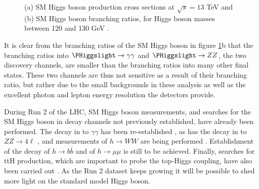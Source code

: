 \begin{figure}[h!]
\begin{center}
\end{center}
\caption{(a) \ac{SM} Higgs boson production cross sections at $\sqrt{s} = 13$ TeV and (b) \ac{SM}
Higgs boson branching ratios, for Higgs boson masses between 120 and 130 GeV \cite{YR4}.}
\label{fig:theory_smhxsbr}
\end{figure}

It is clear from the branching ratios of the \ac{SM} Higgs boson in figure \ref{fig:theory_smhxsbr}b that
the branching ratios into
$\PHiggslight \rightarrow \gamma\gamma$ and $\PHiggslight \rightarrow ZZ$, the two discovery
channels, are smaller than the branching ratios into many other final states.
These two channels are thus not sensitive as a result of their branching ratio, but
rather due to the small backgrounds in these analysis as well as the excellent photon and lepton energy resolution the detectors provide.

During Run 2 of the LHC, \ac{SM} Higgs boson measurements, and searches for the 
\ac{SM} Higgs boson in decay channels not previously established, have 
already been performed. The decay in to $\gamma\gamma$ has been re-established \cite{CMSHgamgam2016,ATLASHgamgam2016},
as has the decay in to $ZZ\rightarrow 4\ell$ \cite{CMSHZZ2016,ATLASHZZ2016}, and measurements
of $h\rightarrow WW$ are being performed \cite{CMSHWW2016,ATLASHWW2016}. Establishment of the decay of 
$h\rightarrow b\bar{b}$ \cite{CMSVBFHbb2016,ATLASVHbb2016} and of $h\rightarrow \mu\mu$ \cite{ATLASHmm2016} 
is still to be achieved.
Finally, searches for ttH production, which are important to probe the top-Higgs coupling, have also been carried 
out \cite{CMSttH2016,CMSttHmultilep2016,ATLASttHbb2016,ATLASttHmultilep2016}. As the Run 2 dataset
keeps growing it will be possible to shed more light on the standard model Higgs boson.

